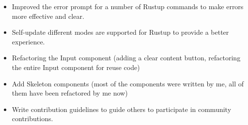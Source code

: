 \documentclass{resume}
\newcommand{\en}[1]{#1}
\newcommand{\zh}[1]{}
\begin{document}
\en{}
\zh{\role{维护者}{\href{https://github.com/rust-lang/rustup/commits?author=hi-rustin}{85+ 个提交}}}
\begin{itemize}
      \item \en{Improved the error prompt for a number of Rustup commands to make errors more effective and clear.}
            \zh{改善了大量 Rustup 命令的错误提示，让错误更有效更清晰。}
      \item \en{Self-update different modes are supported for Rustup to provide a better experience.}
            \zh{为 Rustup 支持了 self-update 不同模式来提供更好的使用体验。}
\end{itemize}

\en{}
\zh{\role{维护者}{\href{https://github.com/ant-design/ant-design/commits?author=hi-rustin}{24+ 个提交}}}
\begin{itemize}
      \item \en{Refactoring the Input component (adding a clear content button, refactoring the entire Input component for reuse code)}
            \zh{重构 Input 组件（添加一个清除内容按钮，为了复用代码重构整个 Input 组件）}
      \item \en{Add Skeleton components (most of the components were written by me, all of them have been refactored by me now)}
            \zh{添加 Skeleton 组件（大部分组件由我编写，目前所有组件已被我重构）}
      \item \en{Write contribution guidelines to guide others to participate in community contributions.}
            \zh{编写贡献指南，引导其他人参与社区贡献。}
\end{itemize}
\end{document}
